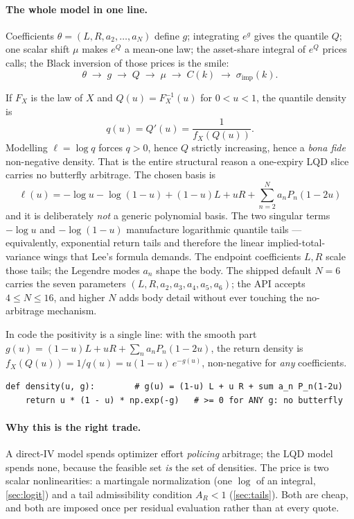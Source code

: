 \documentclass[11pt]{article}
\begin{document}
\paragraph{The whole model in one line.} Coefficients
$\theta=(L,R,a_2,\dots,a_N)$ define $g$; integrating $e^{g}$ gives the
quantile $Q$; one scalar shift $\mu$ makes $e^{Q}$ a mean-one law; the
asset-share integral of $e^{Q}$ prices calls; the Black inversion of those
prices is the smile:
\[
\theta\;\to\;g\;\to\;Q\;\to\;\mu\;\to\;C(k)\;\to\;\sigma_{\text{imp}}(k).
\]

If $F_X$ is the law of $X$ and $Q(u)=F_X^{-1}(u)$ for $0<u<1$, the quantile
density is
\begin{equation}
q(u)=Q'(u)=\frac{1}{f_X(Q(u))}.
\end{equation}
Modelling $\ell=\log q$ forces $q>0$, hence $Q$ strictly increasing, hence a
\emph{bona fide} non-negative density. That is the entire structural reason a
one-expiry LQD slice carries no butterfly arbitrage. The chosen basis is
\begin{equation}
\boxed{\;
\ell(u)=-\log u-\log(1-u)+(1-u)L+uR+\sum_{n=2}^{N}a_nP_n(1-2u)\;}
\label{eq:lqd_main}
\end{equation}
and it is deliberately \emph{not} a generic polynomial basis. The two singular
terms $-\log u$ and $-\log(1-u)$ manufacture logarithmic quantile tails ---
equivalently, exponential return tails and therefore the linear
implied-total-variance wings that Lee's formula demands. The endpoint
coefficients $L,R$ scale those tails; the Legendre modes $a_n$ shape the body.
The shipped default $N=6$ carries the seven parameters
$(L,R,a_2,a_3,a_4,a_5,a_6)$; the API accepts $4\le N\le16$, and higher $N$ adds
body detail without ever touching the no-arbitrage mechanism.

In code the positivity is a single line: with the smooth part
$g(u)=(1-u)L+uR+\sum_n a_nP_n(1-2u)$, the return density is $f_X(Q(u))=1/q(u)=
u(1-u)\,e^{-g(u)}$, non-negative for \emph{any} coefficients.

\begin{lstlisting}[caption={The LQD density is structurally non-negative --- no
constraint, no penalty (distilled from \texttt{models/lqd/quadrature.py}).},
label={lst:lqd_density}]
def density(u, g):        # g(u) = (1-u) L + u R + sum a_n P_n(1-2u)
    return u * (1 - u) * np.exp(-g)   # >= 0 for ANY g: no butterfly
\end{lstlisting}

\paragraph{Why this is the right trade.} A direct-IV model spends optimizer
effort \emph{policing} arbitrage; the LQD model spends none, because the feasible
set \emph{is} the set of densities. The price is two scalar nonlinearities: a
martingale normalization (one $\log$ of an integral, \cref{sec:logit}) and a tail
admissibility condition $A_R<1$ (\cref{sec:tails}). Both are cheap, and both are
imposed once per residual evaluation rather than at every quote.
\end{document}

